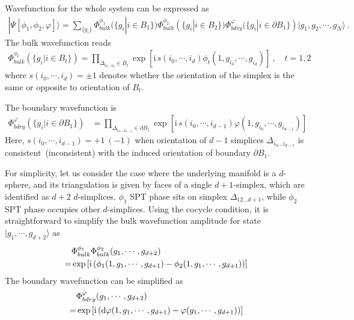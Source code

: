 \documentclass[%
  reprint,
  amsmath,amssymb,
  aps,pra,
]{revtex4-1}
\newcommand{\dd}{\mathrm{d}} %
\newcommand{\ii}{\mathrm{i}\,} %
\begin{document}
\begin{widetext}
  Wavefunction for the whole system can be expressed as
  \begin{align}
    |\Psi[\phi_1,\phi_2,\varphi]\rangle=\sum_{\{g_i\}}\Phi_{bulk}^{\phi_1}(\{g_i|i\in B_1\}) \Phi_{bulk}^{\phi_2}(\{g_i|i\in B_2\})
    \Phi_{bdry}^{\varphi}(\{g_i|i\in \partial B_1\})|g_1,g_2,\cdots,g_N\rangle~.
    \label{}
  \end{align}
  The bulk wavefunction reads
  \begin{align}
    \Phi_{bulk}^{\phi_t}(\{g_i|i\in B_t\})=\prod_{\Delta_{i_0\ldots i_d}\in B_t}\exp\left[ \ii s(i_0,\cdots,i_{d})\phi_t(1,g_{i_0},\cdots,g_{i_{d}})\right]~,\quad t=1,2
    \label{}
  \end{align}
  where $s(i_0,\cdots,i_{d})=\pm1$ denotes whether the orientation of the simplex is the same or opposite to orientation of $B_t$.

  The boundary wavefunction is
  \begin{align}
    \Phi_{bdry}^{\varphi}(\{g_i|i\in \partial B_1\})&=\prod_{\Delta_{i_0\ldots i_{d-1}}\in \partial B_1}\exp\left[ \ii s(i_0,\cdots,i_{d-1})\varphi(1,g_{i_0},\cdots,g_{i_{d-1}})\right]
    \label{}
  \end{align}
  Here, $s(i_0,\cdots,i_{d-1})=+1~(-1)$ when orientation of $d-1$ simplices $\Delta_{i_0\ldots i_{d-1}}$ is consistent~(inconsistent) with the induced orientation of boundary $\partial B_1$.
\end{widetext}
For simplicity, let us consider the case where the underlying manifold is a $d$-sphere, and its triangulation is given by faces of a single $d+1$-simplex, which are identified as $d+2$ $d$-simplices.
$\phi_1$ SPT phase sits on simplex $\Delta_{12\ldots {d+1}}$, while $\phi_2$ SPT phase occupies other $d$-simplices.
Using the cocycle condition, it is straightforward to simplify the bulk wavefunction amplitude for state $|g_1,\cdots,g_{d+2}\rangle$ as
\begin{align}
  &\Phi_{bulk}^{\phi_1}\Phi_{bulk}^{\phi_2}(g_1,\cdots,g_{d+2})\notag\\
  =&\exp\left[ \ii (\phi_1(1,g_1,\cdots,g_{d+1})-\phi_2(1,g_1,\cdots,g_{d+1})) \right]
  \label{eq:bulk_spt_wf}
\end{align}
The boundary wavefunction can be simplified as
\begin{align}
  &\Phi_{bdry}^\varphi(g_1,\cdots,g_{d+2})\notag\\
  =&\exp\left[ \ii (\dd\varphi(1,g_1,\cdots,g_{d+1})-\varphi(g_1,\cdots,g_{d+1}) ) \right]
  \label{eq:bdry_spt_wf}
\end{align}
\end{document}

